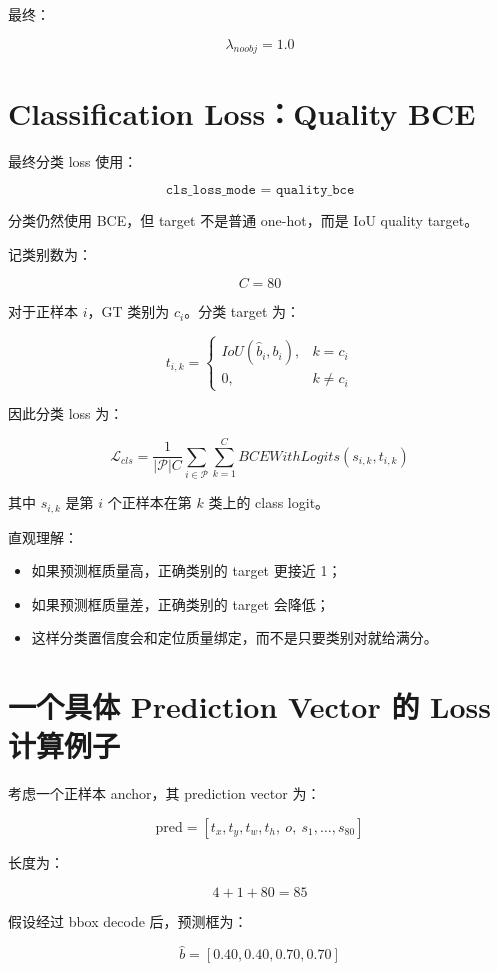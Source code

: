 \documentclass[UTF8,12pt]{ctexart}
\begin{document}
最终：

\[
\lambda_{noobj}=1.0
\]

\section{Classification Loss：Quality BCE}

最终分类 loss 使用：

\[
\texttt{cls\_loss\_mode = quality\_bce}
\]

分类仍然使用 BCE，但 target 不是普通 one-hot，而是 IoU quality target。

记类别数为：

\[
C=80
\]

对于正样本 $i$，GT 类别为 $c_i$。分类 target 为：

\[
t_{i,k}
=
\begin{cases}
IoU(\hat{b}_i,b_i), & k = c_i \\
0, & k \neq c_i
\end{cases}
\]

因此分类 loss 为：

\[
\mathcal{L}_{cls}
=
\frac{1}{|\mathcal{P}|C}
\sum_{i \in \mathcal{P}}
\sum_{k=1}^{C}
BCEWithLogits(s_{i,k}, t_{i,k})
\]

其中 $s_{i,k}$ 是第 $i$ 个正样本在第 $k$ 类上的 class logit。

直观理解：

\begin{itemize}[leftmargin=2em]
    \item 如果预测框质量高，正确类别的 target 更接近 1；
    \item 如果预测框质量差，正确类别的 target 会降低；
    \item 这样分类置信度会和定位质量绑定，而不是只要类别对就给满分。
\end{itemize}

\section{一个具体 Prediction Vector 的 Loss 计算例子}

考虑一个正样本 anchor，其 prediction vector 为：

\[
\text{pred}
=
[
t_x,t_y,t_w,t_h,\ o,\ s_1,\ldots,s_{80}
]
\]

长度为：

\[
4 + 1 + 80 = 85
\]

假设经过 bbox decode 后，预测框为：

\[
\hat{b}=[0.40,0.40,0.70,0.70]
\]
\end{document}
